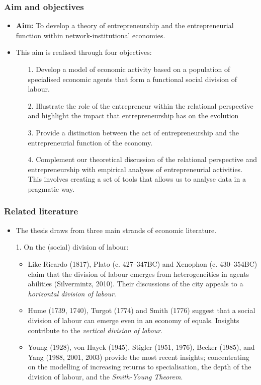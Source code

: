 \documentclass[10pt]{beamer}
\begin{document}
\begin{frame} \frametitle{Aim and objectives}
\begin{itemize}
\item \textbf{Aim:} To develop a theory of entrepreneurship and the entrepreneurial function within network-institutional economies.
\medskip
\item This aim is realised through four objectives:
\begin{itemize}
\medskip
\item[1.] Develop a model of economic activity based on a population of specialised economic agents that form a functional social division of labour.
\medskip
\item[2.] Illustrate the role of the entrepreneur within the relational perspective and highlight the impact that entrepreneurship has on the evolution
\medskip
\item[3.] Provide a distinction between the act of entrepreneurship and the entrepreneurial function of the economy.
\medskip
\item[4.] Complement our theoretical discussion of the relational perspective and entrepreneurship with empirical analyses of entrepreneurial activities. This involves creating a set of tools that allows us to analyse data in a pragmatic way.
\end{itemize}
\end{itemize}
\end{frame}

\begin{frame} \frametitle{Related literature}
\begin{itemize}
\item The thesis draws from three main strands of economic literature.
\medskip
\item[1.] On the (social) division of labour:
\begin{itemize}
\medskip
\item Like Ricardo (1817), Plato (c. 427--347BC) and Xenophon (c. 430--354BC) claim that the division of labour emerges from heterogeneities in agents abilities (Silvermintz, 2010). Their discussions of the city appeals to a \emph{horizontal division of labour}.
\medskip
\item Hume (1739, 1740), Turgot (1774) and Smith (1776) suggest that a social division of labour can emerge even in an economy of equals. Insights contribute to the \emph{vertical division of labour}.
\medskip
\item Young (1928), von Hayek (1945), Stigler (1951, 1976), Becker (1985), and Yang (1988, 2001, 2003) provide the most recent insights; concentrating on the modelling of increasing returns to specialisation, the depth of the division of labour, and the \emph{Smith-Young Theorem}.
\end{itemize}
\end{itemize}
\end{frame}
\end{document}
